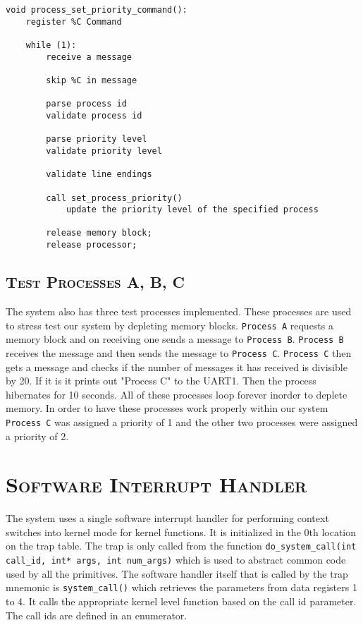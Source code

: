 \documentclass[oneside]{report}
\begin{document}

\begin{lstlisting}
void process_set_priority_command():    
    register %C Command

    while (1):
        receive a message

        skip %C in message

        parse process id
        validate process id

        parse priority level
        validate priority level

        validate line endings
        
        call set_process_priority()
            update the priority level of the specified process

        release memory block;
        release processor;
\end{lstlisting}

\subsection{\textsc{Test Processes A, B, C}}
The system also has three test processes implemented. These processes are used
to stress test our system by depleting memory blocks. \texttt{Process A}
requests a memory block and on receiving one sends a message to \texttt{Process
B}. \texttt{Process B} receives the message and then sends the message to
\texttt{Process C}. \texttt{Process C} then gets a message and checks if the
number of messages it has received is divisible by 20. If it is it prints out
"Process C" to the UART1. Then the process hibernates for 10 seconds. All of
these processes loop forever inorder to deplete memory. In order to have these
processes work properly within our system \texttt{Process C} was assigned a
priority of 1 and the other two processes were assigned a priority of 2.

\section{\textsc{Software Interrupt Handler}}


The system uses a single software interrupt handler for performing context
switches into kernel mode for kernel functions. It is initialized in the 0th
location on the trap table. The trap is only called from the function
\texttt{do\_system\_call(int call\_id, int* args, int num\_args)} which is used
to abstract common code used by all the primitives. The software handler itself
that is called by the trap mnemonic is \texttt{system\_call()} which retrieves
the parameters from data registers 1 to 4. It calls the appropriate kernel
level function based on the call id parameter. The call ids are defined in an
enumerator. 
\end{document}
